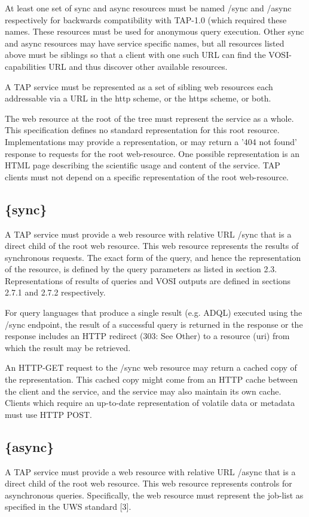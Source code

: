 \documentclass[11pt,a4paper]{ivoa}
\begin{document}
At least one set of {sync} and {async} resources must be named /sync and 
/async respectively for backwards compatibility with TAP-1.0 (which required 
these names. These resources must be used for anonymous query execution. Other 
{sync} and {async} resources may have service specific names, but all resources 
listed above must be siblings so that a client with one such URL can find the 
VOSI-capabilities URL and thus discover other available resources. 

A TAP service must be represented as a set of sibling web resources each 
addressable via a URL in the http scheme, or the https scheme, or both.

The web resource at the root of the tree must represent the service as a whole. 
This specification defines no standard representation for this root resource. 
Implementations may provide a representation, or may return a '404 not found' 
response to requests for the root web-resource. One possible representation is 
an HTML page describing the scientific usage and content of the service. TAP 
clients must not depend on a specific representation of the root web-resource.

\subsection{\{sync\}}
A TAP service must provide a web resource with relative URL /sync that is a 
direct child of the root web resource. This web resource represents the results 
of synchronous requests. The exact form of the query, and hence the 
representation of the resource, is defined by the  query parameters as listed in 
section 2.3. Representations of results of queries and VOSI outputs are defined 
in sections 2.7.1 and 2.7.2 respectively.

For query languages that produce a single result (e.g. ADQL) executed using the 
/sync endpoint, the result of a successful query is returned in the response or 
the response includes an HTTP redirect (303: See Other) to a resource (uri) from 
which the result may be retrieved.

An HTTP-GET request to the /sync web resource may return a cached copy of the 
representation. This cached copy might come from an HTTP cache between the 
client and the service, and the service may also maintain its own cache. Clients 
which require an up-to-date representation of volatile data or metadata must use 
HTTP POST.

\subsection{\{async\}}
A TAP service must provide a web resource with relative URL /async that is a 
direct child of the root web resource. This web resource represents controls for 
asynchronous queries. Specifically, the web resource must represent the job-list 
as specified in the UWS standard [3].
\end{document}
